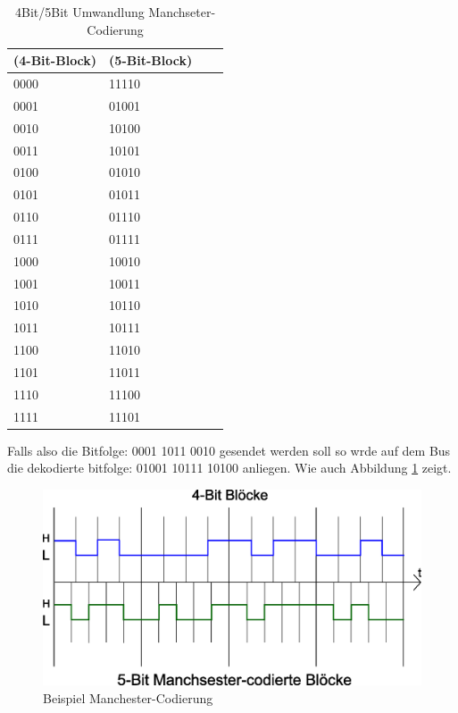 \documentclass[a4paper]{book}%
\begin{document}
\begin{table}
\caption{4Bit/5Bit Umwandlung Manchseter-Codierung}
\label{tab:umwandlung}
\centering
\begin{tabular}{llll}\toprule
(4-Bit-Block) & (5-Bit-Block) \\ \midrule
0000 &	11110 \\
0001 &	01001 \\
0010 &	10100 \\
0011 &	10101 \\
0100 &	01010 \\
0101 &	01011 \\
0110 &	01110 \\
0111 &	01111 \\
1000 &	10010 \\
1001 &	10011 \\
1010 &	10110 \\
1011 &	10111 \\
1100 &	11010 \\
1101 &	11011 \\
1110 &	11100 \\
1111 &	11101 \\ \bottomrule
\end{tabular}
\vspace{5 mm}
\end{table}



Falls also die Bitfolge:  0001 1011 0010 \newline
gesendet werden soll so wrde auf dem Bus die dekodierte bitfolge: 01001 10111 10100\newline
anliegen. Wie auch Abbildung \ref{fig:manu} zeigt.

\begin{figure}[H]
	\centering
	\includegraphics[width=1.0\textwidth]{figures/manchester.eps}
	\caption[Beispiel Manchester-Codierung]{Beispiel Manchester-Codierung}
	\label{fig:manu}
\end{figure}
\end{document}
